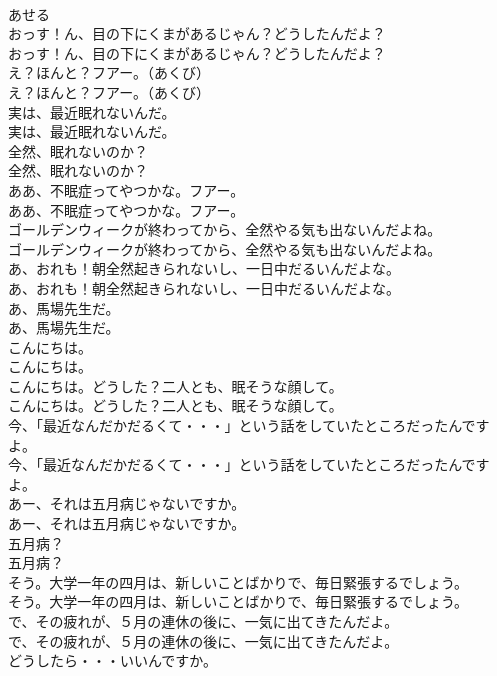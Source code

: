 \documentclass[8pt]{extreport}
\begin{document}
\begin{CJK}{UTF8}{min}
\\	あせる
\\	おっす！ん、目の下にくまがあるじゃん？どうしたんだよ？	
\\	おっす！ん、目の下にくまがあるじゃん？どうしたんだよ？ 
\\	え？ほんと？フアー。（あくび）	
\\	え？ほんと？フアー。（あくび） 
\\	実は、最近眠れないんだ。	
\\	実は、最近眠れないんだ。 
\\	全然、眠れないのか？	
\\	全然、眠れないのか？ 
\\	ああ、不眠症ってやつかな。フアー。	
\\	ああ、不眠症ってやつかな。フアー。 
\\	ゴールデンウィークが終わってから、全然やる気も出ないんだよね。	
\\	ゴールデンウィークが終わってから、全然やる気も出ないんだよね。 
\\	あ、おれも！朝全然起きられないし、一日中だるいんだよな。	
\\	あ、おれも！朝全然起きられないし、一日中だるいんだよな。 
\\	あ、馬場先生だ。	
\\	あ、馬場先生だ。 
\\	こんにちは。	
\\	こんにちは。 
\\	こんにちは。どうした？二人とも、眠そうな顔して。	
\\	こんにちは。どうした？二人とも、眠そうな顔して。 
\\	今、「最近なんだかだるくて・・・」という話をしていたところだったんですよ。	
\\	今、「最近なんだかだるくて・・・」という話をしていたところだったんですよ。 
\\	あー、それは五月病じゃないですか。	
\\	あー、それは五月病じゃないですか。 
\\	五月病？	
\\	五月病？ 
\\	そう。大学一年の四月は、新しいことばかりで、毎日緊張するでしょう。	
\\	そう。大学一年の四月は、新しいことばかりで、毎日緊張するでしょう。 
\\	で、その疲れが、５月の連休の後に、一気に出てきたんだよ。	
\\	で、その疲れが、５月の連休の後に、一気に出てきたんだよ。 
\\	どうしたら・・・いいんですか。	

\end{CJK}
\end{document}
